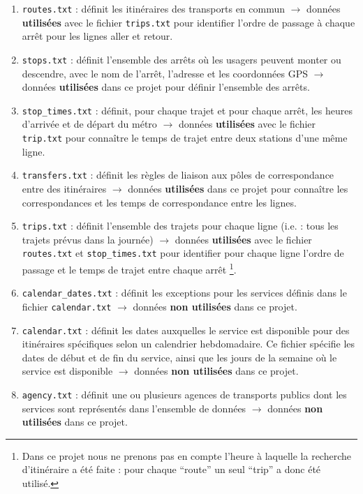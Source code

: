 \documentclass[,french]{article}
\let\rmarkdownfootnote\footnote%
\def\footnote{\protect\rmarkdownfootnote}
\begin{document}
\begin{enumerate}
\def\labelenumi{\arabic{enumi}.}
\item
  \texttt{routes.txt} : définit les itinéraires des transports en commun
  \(\rightarrow\) données \textbf{utilisées} avec le fichier
  \texttt{trips.txt} pour identifier l'ordre de passage à chaque arrêt
  pour les lignes aller et retour.
\item
  \texttt{stops.txt} : définit l'ensemble des arrêts où les usagers
  peuvent monter ou descendre, avec le nom de l'arrêt, l'adresse et les
  coordonnées GPS \(\rightarrow\) données \textbf{utilisées} dans ce
  projet pour définir l'ensemble des arrêts.
\item
  \texttt{stop\_times.txt} : définit, pour chaque trajet et pour chaque
  arrêt, les heures d'arrivée et de départ du métro \(\rightarrow\)
  données \textbf{utilisées} avec le fichier \texttt{trip.txt} pour
  connaître le temps de trajet entre deux stations d'une même ligne.
\item
  \texttt{transfers.txt} : définit les règles de liaison aux pôles de
  correspondance entre des itinéraires \(\rightarrow\) données
  \textbf{utilisées} dans ce projet pour connaître les correspondances
  et les temps de correspondance entre les lignes.
\item
  \texttt{trips.txt} : définit l'ensemble des trajets pour chaque ligne
  (i.e. : tous les trajets prévus dans la journée) \(\rightarrow\)
  données \textbf{utilisées} avec le fichier \texttt{routes.txt} et
  \texttt{stop\_times.txt} pour identifier pour chaque ligne l'ordre de
  passage et le temps de trajet entre chaque arrêt \footnote{Dans ce
    projet nous ne prenons pas en compte l'heure à laquelle la recherche
    d'itinéraire a été faite : pour chaque ``route'' un seul ``trip'' a
    donc été utilisé.}.
\item
  \texttt{calendar\_dates.txt} : définit les exceptions pour les
  services définis dans le fichier \texttt{calendar.txt} \(\rightarrow\)
  données \textbf{non utilisées} dans ce projet.
\item
  \texttt{calendar.txt} : définit les dates auxquelles le service est
  disponible pour des itinéraires spécifiques selon un calendrier
  hebdomadaire. Ce fichier spécifie les dates de début et de fin du
  service, ainsi que les jours de la semaine où le service est
  disponible \(\rightarrow\) données \textbf{non utilisées} dans ce
  projet.
\item
  \texttt{agency.txt} : définit une ou plusieurs agences de transports
  publics dont les services sont représentés dans l'ensemble de données
  \(\rightarrow\) données \textbf{non utilisées} dans ce projet.
\end{enumerate}
\end{document}
